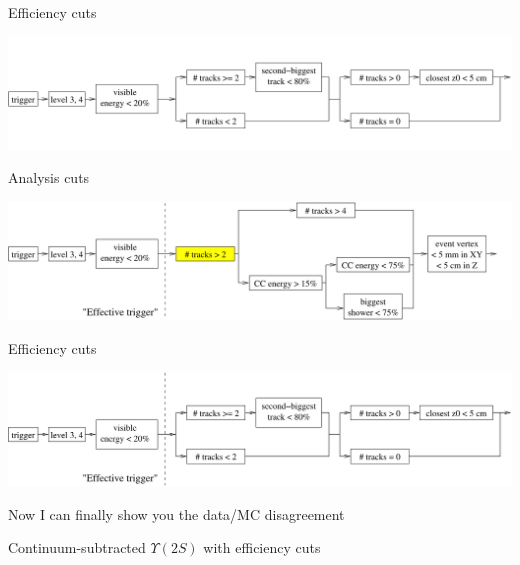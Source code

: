 \documentclass[landscape]{article}
\begin{document}
\vfill
{\Huge Efficiency cuts}

\begin{center}
\includegraphics[width=\linewidth]{reffcuts0.pdf}
\end{center}
\vfill
\pagebreak

{\Huge Analysis cuts}

\begin{center}
\includegraphics[width=\linewidth]{cuts2.pdf}
\end{center}
\vfill

{\Huge Efficiency cuts}

\begin{center}
\includegraphics[width=\linewidth]{reffcuts2.pdf}
\end{center}
\vfill
\pagebreak

{\Huge Now I can finally show you the data/MC disagreement}

\vspace{1 cm}
Continuum-subtracted $\Upsilon(2S)$ with efficiency cuts
\vspace{-1 cm}
\end{document}

